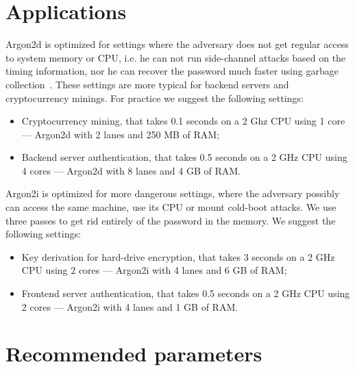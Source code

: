 \documentclass[a4paper]{article}
\begin{document}
\section{Applications}
\textsf{Argon2d} is optimized for settings where the adversary does not get regular access to system memory or CPU, i.e. he can not run side-channel attacks based on the timing information, nor he
can recover the password much faster using garbage collection~\cite{cryptoeprint:2014:881}. These settings are more typical for backend servers and cryptocurrency minings. For practice we suggest the following settings:
\begin{itemize}
  \item Cryptocurrency mining, that takes 0.1 seconds on a 2 Ghz CPU using 1 core --- \textsf{Argon2d} with 2 lanes and 250 MB of RAM;
  \item Backend server authentication, that takes 0.5 seconds on a 2 GHz CPU using 4 cores --- \textsf{Argon2d} with 8 lanes and 4 GB of RAM.
\end{itemize}

\textsf{Argon2i} is optimized for more dangerous settings, where the adversary possibly can access the same machine, use its CPU or mount cold-boot attacks. We use three passes to get rid entirely of the password in the memory. We suggest the following settings:
\begin{itemize}
  \item Key derivation for hard-drive encryption, that takes 3 seconds on a 2 GHz CPU using 2 cores --- \textsf{Argon2i} with 4 lanes and 6 GB of RAM;
  \item Frontend server authentication, that takes 0.5 seconds on a 2 GHz CPU using 2 cores --- \textsf{Argon2i} with 4 lanes and 1 GB of RAM.
\end{itemize}

\section{Recommended parameters}
\end{document}
